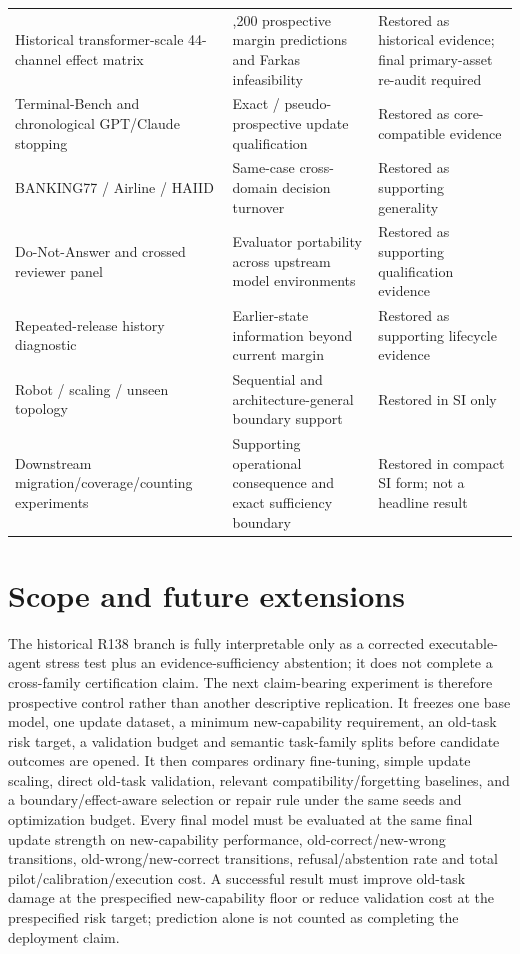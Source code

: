 \documentclass[11pt,letterpaper]{article}
\theoremstyle{plain}
\newcommand{\1}{\mathbf 1}
\begin{document}
\begin{longtable}{>{\raggedright\arraybackslash}p{}>{\raggedright\arraybackslash}p{}>{\raggedright\arraybackslash}p{}}
Historical transformer-scale 44-channel effect matrix & 75,200 prospective margin predictions and Farkas infeasibility & Restored as historical evidence; final primary-asset re-audit required \\
Terminal-Bench and chronological GPT/Claude stopping & Exact / pseudo-prospective update qualification & Restored as core-compatible evidence \\
BANKING77 / Airline / HAIID & Same-case cross-domain decision turnover & Restored as supporting generality \\
Do-Not-Answer and crossed reviewer panel & Evaluator portability across upstream model environments & Restored as supporting qualification evidence \\
Repeated-release history diagnostic & Earlier-state information beyond current margin & Restored as supporting lifecycle evidence \\
Robot / scaling / unseen topology & Sequential and architecture-general boundary support & Restored in SI only \\
Downstream migration/coverage/counting experiments & Supporting operational consequence and exact sufficiency boundary & Restored in compact SI form; not a headline result \\
\bottomrule
\end{longtable}
\normalsize

\section{Scope and future extensions}
The historical R138 branch is fully interpretable only as a corrected executable-agent stress test plus an evidence-sufficiency abstention; it does not complete a cross-family certification claim. The next claim-bearing experiment is therefore prospective control rather than another descriptive replication. It freezes one base model, one update dataset, a minimum new-capability requirement, an old-task risk target, a validation budget and semantic task-family splits before candidate outcomes are opened. It then compares ordinary fine-tuning, simple update scaling, direct old-task validation, relevant compatibility/forgetting baselines, and a boundary/effect-aware selection or repair rule under the same seeds and optimization budget. Every final model must be evaluated at the same final update strength on new-capability performance, old-correct/new-wrong transitions, old-wrong/new-correct transitions, refusal/abstention rate and total pilot/calibration/execution cost. A successful result must improve old-task damage at the prespecified new-capability floor or reduce validation cost at the prespecified risk target; prediction alone is not counted as completing the deployment claim.
\end{document}
